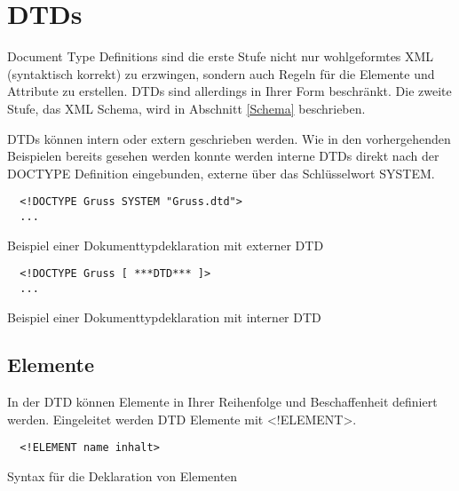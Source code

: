 \section{DTDs}\label{DTD}
Document Type Definitions sind die erste Stufe nicht nur wohlgeformtes XML (syntaktisch korrekt) zu erzwingen, sondern
auch Regeln für die Elemente und Attribute zu erstellen. DTDs sind allerdings in Ihrer Form beschränkt. Die zweite
Stufe, das XML Schema, wird in Abschnitt \ref{Schema} beschrieben.

DTDs können intern oder extern geschrieben werden. Wie in den vorhergehenden Beispielen bereits gesehen werden konnte
werden interne DTDs direkt nach der DOCTYPE Definition eingebunden, externe über das Schlüsselwort SYSTEM.

\begin{listing}[H]
\begin{verbatim}
  <!DOCTYPE Gruss SYSTEM "Gruss.dtd">
  ...
\end{verbatim}
\caption{Beispiel einer Dokumenttypdeklaration mit externer DTD}
\end{listing}
\begin{listing}[H]
\begin{verbatim}
  <!DOCTYPE Gruss [ ***DTD*** ]>
  ...
\end{verbatim}
\caption{Beispiel einer Dokumenttypdeklaration mit interner DTD}
\end{listing}

\subsection{Elemente}
In der DTD können Elemente in Ihrer Reihenfolge und Beschaffenheit definiert werden. Eingeleitet werden DTD Elemente mit
\textless!ELEMENT\textgreater. 

\begin{listing}[H]
\begin{verbatim}
  <!ELEMENT name inhalt>
\end{verbatim}
\caption{Syntax für die Deklaration von Elementen}
\end{listing}

